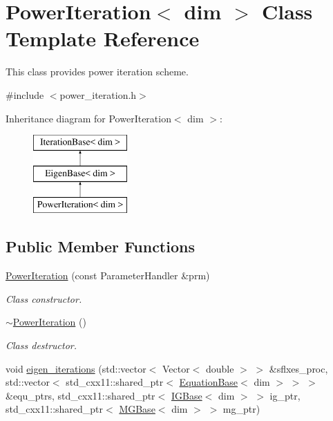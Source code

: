 \hypertarget{class_power_iteration}{}\section{Power\+Iteration$<$ dim $>$ Class Template Reference}
\label{class_power_iteration}


This class provides power iteration scheme.  




{\ttfamily \#include $<$power\+\_\+iteration.\+h$>$}

Inheritance diagram for Power\+Iteration$<$ dim $>$\+:\begin{figure}[H]
\begin{center}
\leavevmode
\includegraphics[height=3.000000cm]{class_power_iteration}
\end{center}
\end{figure}
\subsection*{Public Member Functions}
\begin{DoxyCompactItemize}
\item 
\hyperlink{class_power_iteration_a2608445223ce7d27b24be0f9d7042554}{Power\+Iteration} (const Parameter\+Handler \&prm)
\begin{DoxyCompactList}\small\item\em Class constructor. \end{DoxyCompactList}\item 
\hyperlink{class_power_iteration_ad660a351afc4f23b1bcf7b334ef033dd}{$\sim$\+Power\+Iteration} ()
\begin{DoxyCompactList}\small\item\em Class destructor. \end{DoxyCompactList}\item 
void \hyperlink{class_power_iteration_a583586002126f8b7a523e95327047cba}{eigen\+\_\+iterations} (std\+::vector$<$ Vector$<$ double $>$ $>$ \&sflxes\+\_\+proc, std\+::vector$<$ std\+\_\+cxx11\+::shared\+\_\+ptr$<$ \hyperlink{class_equation_base}{Equation\+Base}$<$ dim $>$ $>$ $>$ \&equ\+\_\+ptrs, std\+\_\+cxx11\+::shared\+\_\+ptr$<$ \hyperlink{class_i_g_base}{I\+G\+Base}$<$ dim $>$ $>$ ig\+\_\+ptr, std\+\_\+cxx11\+::shared\+\_\+ptr$<$ \hyperlink{class_m_g_base}{M\+G\+Base}$<$ dim $>$ $>$ mg\+\_\+ptr)
\end{DoxyCompactItemize}
